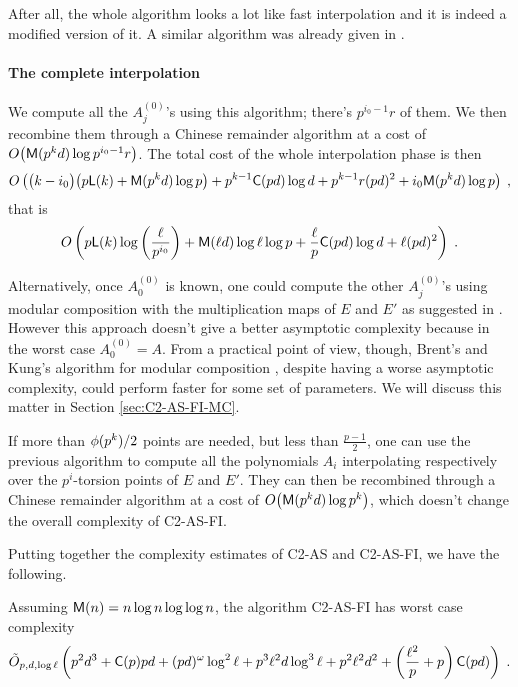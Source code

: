 After all, the whole algorithm looks a lot like fast interpolation
\cite[$\S$10]{vzGG} and it is indeed a modified version of it. A
similar algorithm was already given in \cite{EnMo03}.


\paragraph{The complete interpolation}
We compute all the $A_j^{(0)}$'s using this algorithm; there's
$p^{i_0-1}r$ of them. We then recombine them through a Chinese
remainder algorithm at a cost of $O\bigl(\mathrm{\sf M}(p^kd)\log
p^{i_0-1}r\bigr)$. The total cost of the whole interpolation phase is
then
\begin{equation*}
  O\left(\bigl(k-i_0\bigr) \bigl(p{\sf L}(k) + \mathrm{\sf M}(p^kd)\log p\bigr) +
    p^{k-1}\mathrm{\sf C}(pd)\log d + p^{k-1}r(pd)^2 + i_0\mathrm{\sf M}(p^kd)\log p
  \right)
  \;\text{,}
\end{equation*}
that is
\begin{equation}
  \label{eq:interp}
  O\left(p{\sf L}(k)\log\left(\frac{\ell}{p^{i_0}}\right) + 
    \mathrm{\sf M}(\ell d)\log\ell\log p +
    \frac{\ell}{p}\mathrm{\sf C}(pd)\log d +
    \ell (pd)^2
  \right)
  \;\text{.}
\end{equation}

Alternatively, once $A_0^{(0)}$ is known, one could compute the other
$A_j^{(0)}$'s using modular composition with the multiplication maps
of $E$ and $E'$ as suggested in \cite{Cou96}. However this approach
doesn't give a better asymptotic complexity because in the worst case
$A_0^{(0)}=A$. From a practical point of view, though, Brent's and
Kung's algorithm for modular composition \cite{BrKu78}, despite having
a worse asymptotic complexity, could perform faster for some set of
parameters. We will discuss this matter in Section
\ref{sec:C2-AS-FI-MC}.

If more than $\phi(p^k)/2$ points are needed, but less than
$\frac{p-1}{2}$, one can use the previous algorithm to compute all the
polynomials $A_i$ interpolating respectively over the $p^i$-torsion
points of $E$ and $E'$. They can then be recombined through a Chinese
remainder algorithm at a cost of $O\bigl(\mathrm{\sf M}(p^kd)\log p^k\bigr)$,
which doesn't change the overall complexity of C2-AS-FI.


Putting together the complexity estimates of C2-AS and C2-AS-FI, we
have the following.

\begin{theorem}
  \label{th:complexity}
  Assuming $\mathrm{\sf M}(n) = n\log n\log\log n$, the algorithm C2-AS-FI has
  worst case complexity
  \begin{equation*}
    \tilde{O}_{p,d,\log\ell}\left(
      p^2d^3 +
      \mathrm{\sf C}(p)pd +
      (pd)^\omega\log^2\ell +
      p^3\ell^2 d\log^3\ell + 
      p^2\ell^2 d^2+
      \left(\frac{\ell^2}{p} + p\right)\mathrm{\sf C}(pd)
    \right)
    \;\text{.}
  \end{equation*}
\end{theorem}



